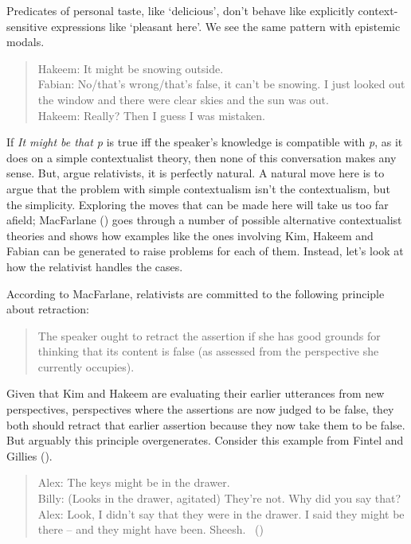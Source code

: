 \documentclass[
  10pt,
  letterpaper,
  DIV=11,
  numbers=noendperiod,
  twoside]{scrartcl}
\begin{document}
Predicates of personal taste, like `delicious', don't behave like
explicitly context-sensitive expressions like `pleasant here'. We see
the same pattern with epistemic modals.

\begin{quote}
Hakeem: It might be snowing outside.\\
Fabian: No/that's wrong/that's false, it can't be snowing. I just looked
out the window and there were clear skies and the sun was out.\\
Hakeem: Really? Then I guess I was mistaken.
\end{quote}

If \emph{It might be that p} is true iff the speaker's knowledge is
compatible with \emph{p}, as it does on a simple contextualist theory,
then none of this conversation makes any sense. But, argue relativists,
it is perfectly natural. A natural move here is to argue that the
problem with simple contextualism isn't the contextualism, but the
simplicity. Exploring the moves that can be made here will take us too
far afield; MacFarlane () goes
through a number of possible alternative contextualist theories and
shows how examples like the ones involving Kim, Hakeem and Fabian can be
generated to raise problems for each of them. Instead, let's look at how
the relativist handles the cases.

According to MacFarlane, relativists are committed to the following
principle about retraction:

\begin{quote}
The speaker ought to retract the assertion if she has good grounds for
thinking that its content is false (as assessed from the perspective she
currently occupies).
\end{quote}

Given that Kim and Hakeem are evaluating their earlier utterances from
new perspectives, perspectives where the assertions are now judged to be
false, they both should retract that earlier assertion because they now
take them to be false. But arguably this principle overgenerates.
Consider this example from Fintel and Gillies
().

\begin{quote}
Alex: The keys might be in the drawer.\\
Billy: (Looks in the drawer, agitated) They're not. Why did you say
that?\\
Alex: Look, I didn't say that they were in the drawer. I said they might
be there -- and they might have been. Sheesh.
~()
\end{quote}
\end{document}
